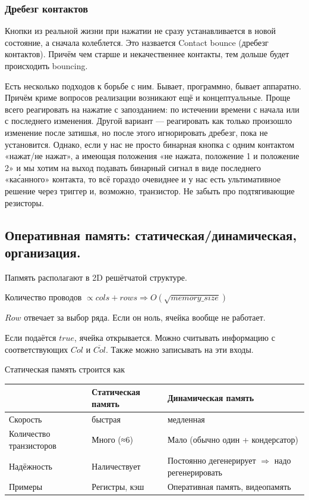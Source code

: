 \documentclass[12pt, a4paper]{article}
\begin{document}
\subsubsection{Дребезг контактов}

Кнопки из реальной жизни при нажатии не сразу устанавливается в новой состояние, а сначала колеблется. 
Это назвается Contact bounce (дребезг контактов). Причём чем старше и некачественнее контакты, тем дольше будет происходить bouncing.

Есть несколько подходов к борьбе с ним. Бывает, программно, бывает аппаратно.
Причём криме вопросов реализации возникают ещё и концептуальные. 
Проще всего реагировать на нажатие с запозданием: по истечении времени с начала или с последнего изменения.
Другой вариант — реагировать как только произошло изменение после затишья, но после этого игнорировать дребезг, пока не установится.
Однако, если у нас не просто бинарная кнопка с одним контактом «нажат/не нажат», 
а имеющая положения «не нажата, положение 1 и положение 2» и мы хотим на выход подавать бинарный сигнал в виде последнего «ка\'санного» контакта, 
то всё гораздо очевиднее и у нас есть ультимативное решение через триггер и, возможно, транзистор.
Не забыть про подтягивающие резисторы.




\subsection{Оперативная память: статическая/динамическая, организация.}

Папмять располагают в 2D решётчатой структуре.

Количество проводов $\propto cols + rows  \Rightarrow O(\sqrt{memory\_size})$

$Row$ отвечает за выбор ряда. Если он ноль, ячейка вообще не работает.

Если подаётся $true$, ячейка открывается. Можно считывать информацию с соответствующих $Col$ и $\overline{Col}$.
Также можно записывать на эти входы.


Статическая память строится как 

\begin{center}
    \begin{tabular}{|| m{10em} | m{10em} | m{12em} ||} 
     \hline
     &                          \textbf{Статическая память}  & \textbf{Динамическая память} \\ [0.5ex] 
     \hline\hline
     Скорость &                 быстрая             & медленная \\ 
     \hline 
     Количество транзисторов &  Много (≈6)          & Мало (обычно один + кондерсатор) \\ 
     \hline
     Надёжность &  Наличествует          & Постоянно дегенерирует $\Rightarrow$ надо регенерировать  \\
     \hline
     Примеры &  Регистры, кэш          & Оперативная память, видеопамять  \\
     \hline
    \end{tabular}
\end{center}
\end{document}
